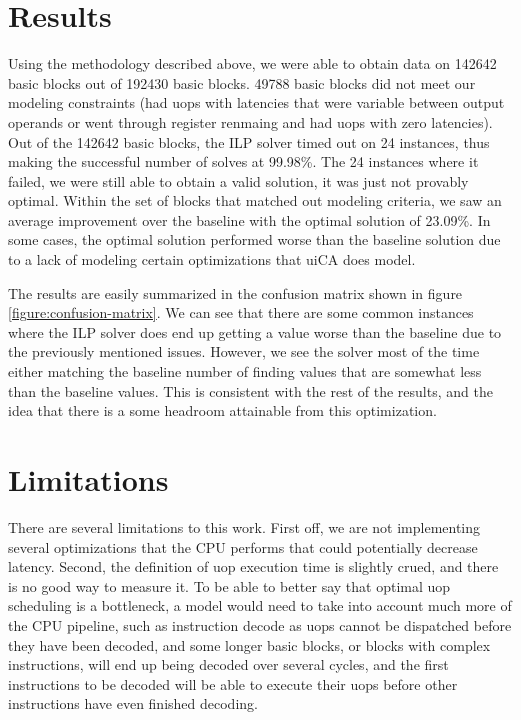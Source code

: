 \documentclass[sigconf]{acmart}
\begin{document}
\section{Results}

Using the methodology described above, we were able to obtain data on 142642 basic blocks out of 192430 basic blocks.
49788 basic blocks did not meet our modeling constraints (had uops with latencies that were variable between output
operands or went through register renmaing and had uops with zero latencies). Out of the 142642 basic blocks, the ILP solver
timed out on 24 instances, thus making the successful number of solves at 99.98\%. The 24 instances where it failed, we were
still able to obtain a valid solution, it was just not provably optimal. Within the set of blocks that matched out
modeling criteria, we saw an average improvement over the baseline with the optimal solution of 23.09\%. In some cases,
the optimal solution performed worse than the baseline solution due to a lack of modeling certain optimizations that
uiCA does model.

The results are easily summarized in the confusion matrix shown in figure \ref{figure:confusion-matrix}. We can see that
there are some common instances where the ILP solver does end up getting a value worse than the baseline due to the
previously mentioned issues. However, we see the solver most of the time either matching the baseline number of finding
values that are somewhat less than the baseline values. This is consistent with the rest of the results, and the idea
that there is a some headroom attainable from this optimization.

\section{Limitations}

There are several limitations to this work. First off, we are not implementing several optimizations that the CPU
performs that could potentially decrease latency. Second, the definition of uop execution time is slightly crued,
and there is no good way to measure it. To be able to better say that optimal uop scheduling is a bottleneck, a model
would need to take into account much more of the CPU pipeline, such as instruction decode as uops cannot be dispatched
before they have been decoded, and some longer basic blocks, or blocks with complex instructions, will end up being decoded
over several cycles, and the first instructions to be decoded will be able to execute their uops before other instructions
have even finished decoding.
\end{document}
